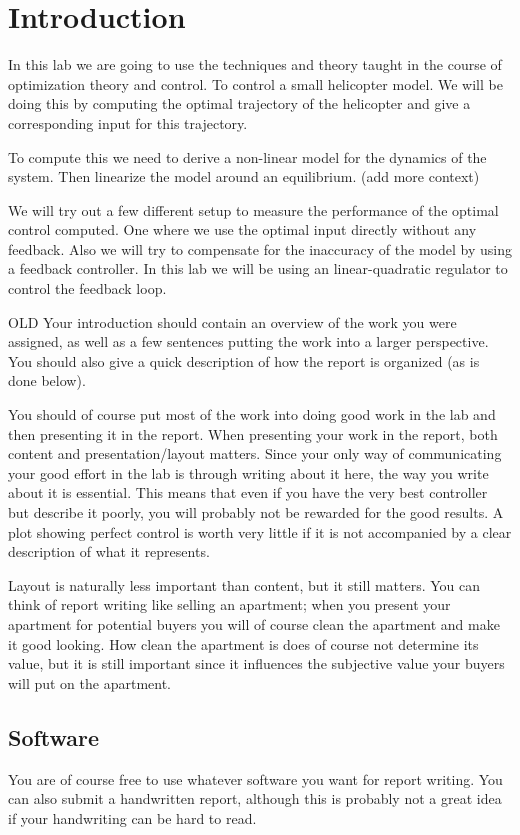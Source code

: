 \section{Introduction}
In this lab we are going to use the techniques and theory taught in the course of optimization theory and control. To control a small helicopter model. We will be doing this by computing the optimal trajectory of the helicopter and give a corresponding input for this trajectory.

To compute this we need to derive a non-linear model for the dynamics of the system. Then linearize the model around an equilibrium. (add more context)

We will try out a few different setup to measure the performance of the optimal control computed. One where we use the optimal input directly without any feedback. Also we will try to compensate for the inaccuracy of the model by using a feedback controller. In this lab we will be using an linear-quadratic regulator to control the feedback loop.

OLD
Your introduction should contain an overview of the work you were assigned, as well as a few sentences putting the work into a larger perspective. You should also give a quick description of how the report is organized (as is done below).

You should of course put most of the work into doing good work in the lab and then presenting it in the report. When presenting your work in the report, both content and presentation/layout matters. Since your only way of communicating your good effort in the lab is through writing about it here, the way you write about it is essential. This means that even if you have the very best controller but describe it poorly, you will probably not be rewarded for the good results. A plot showing perfect control is worth very little if it is not accompanied by a clear description of what it represents.

Layout is naturally less important than content, but it still matters. You can think of report writing like selling an apartment; when you present your apartment for potential buyers you will of course clean the apartment and make it good looking. How clean the apartment is does of course not determine its value, but it is still important since it influences the subjective value your buyers will put on the apartment. 

\subsection{Software}
You are of course free to use whatever software you want for report writing. You can also submit a handwritten report, although this is probably not a great idea if your handwriting can be hard to read. 

